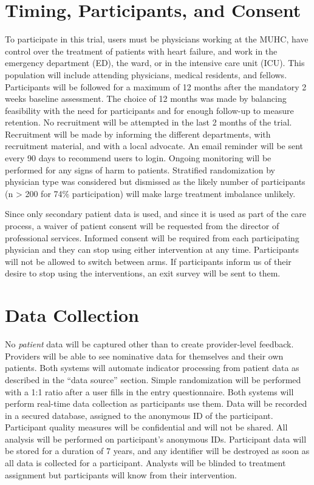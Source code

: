 \section{Timing, Participants, and Consent}
To participate in this trial, users must be physicians working at the MUHC, have control over the treatment of patients with heart failure, and work in the emergency department (ED), the ward, or in the intensive care unit (ICU). This population will include attending physicians, medical residents, and fellows. Participants will be followed for a maximum of 12 months after the mandatory 2 weeks baseline assessment. The choice of 12 months was made by balancing feasibility with the need for participants and for enough follow-up to measure retention. No recruitment will be attempted in the last 2 months of the trial. Recruitment will be made by informing the different departments, with recruitment material, and with a local advocate. An email reminder will be sent every 90 days to recommend users to login. Ongoing monitoring will be performed for any signs of harm to patients. Stratified randomization by physician type was considered but dismissed as the likely number of participants (n > 200 for 74\% participation) will make large treatment imbalance unlikely.

Since only secondary patient data is used, and since it is used as part of the care process, a waiver of patient consent will be requested from the director of professional services. Informed consent will be required from each participating physician and they can stop using either intervention at any time. Participants will not be allowed to switch between arms. If participants inform us of their desire to stop using the interventions, an exit survey will be sent to them.

\section{Data Collection}
No \textit{patient} data will be captured other than to create provider-level feedback. Providers will be able to see nominative data for themselves and their own patients. Both systems will automate indicator processing from patient data as described in the ``data source'' section. Simple randomization will be performed with a 1:1 ratio after a user fills in the entry questionnaire. Both systems will perform real-time data collection as participants use them. Data will be recorded in a secured database, assigned to the anonymous ID of the participant. Participant quality measures will be confidential and will not be shared. All analysis will be performed on participant's anonymous IDs. Participant data will be stored for a duration of 7 years, and any identifier will be destroyed as soon as all data is collected for a participant. Analysts will be blinded to treatment assignment but participants will know from their intervention.

